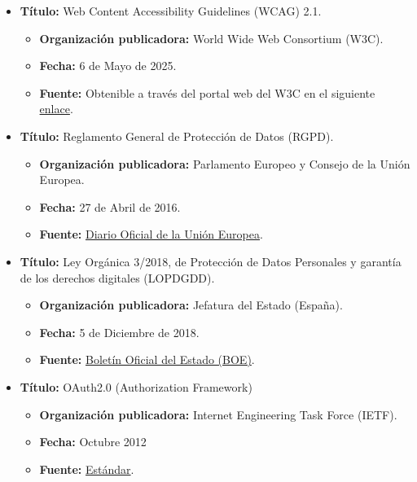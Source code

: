\begin{itemize}
    
    \item \textbf{Título:} Web Content Accessibility Guidelines (WCAG) 2.1.
        \begin{itemize}
            \item \textbf{Organización publicadora:} World Wide Web Consortium (W3C).
            \item \textbf{Fecha:} 6 de Mayo de 2025.
            \item \textbf{Fuente:} Obtenible a través del portal web del W3C en el siguiente \href{https://www.w3.org/TR/WCAG21/}{enlace}.
        \end{itemize}
    \item \textbf{Título:} Reglamento General de Protección de Datos (RGPD).
        \begin{itemize}
            \item \textbf{Organización publicadora:} Parlamento Europeo y Consejo de la Unión Europea.
            \item \textbf{Fecha:} 27 de Abril de 2016.
            \item \textbf{Fuente:} \href{https://eur-lex.europa.eu/eli/reg/2016/679/oj}{Diario Oficial de la Unión Europea}.
        \end{itemize}
    \item \textbf{Título:} Ley Orgánica 3/2018, de Protección de Datos Personales y garantía de los derechos digitales (LOPDGDD).
        \begin{itemize}
            \item \textbf{Organización publicadora:} Jefatura del Estado (España).
            \item \textbf{Fecha:} 5 de Diciembre de 2018.
            \item \textbf{Fuente:} \href{https://www.boe.es/eli/es/lo/2018/12/05/3/con}{Boletín Oficial del Estado (BOE)}.
        \end{itemize}  
    \item \textbf{Título:} OAuth2.0 (Authorization Framework) 
           \begin{itemize}
               \item \textbf{Organización publicadora:} Internet Engineering Task Force (IETF).
               \item \textbf{Fecha:} Octubre 2012
               \item \textbf{Fuente:} \href{https://datatracker.ietf.org/doc/html/rfc6749#section-4.4}{Estándar}.
           \end{itemize}
    

\end{itemize}
